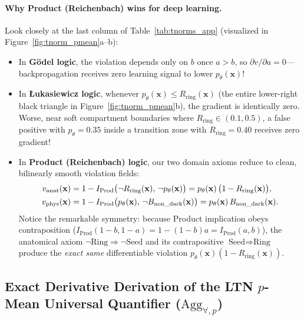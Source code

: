 \documentclass[10pt,a4paper]{article}
\renewcommand{\_}{\origunderscore\allowbreak}
\begin{document}
\paragraph{Why Product (Reichenbach) wins for deep learning.} Look closely at the last column of Table~\ref{tab:tnorms_app} (visualized in Figure~\ref{fig:tnorm_pmean}a--b):
\begin{itemize}
    \item In \textbf{G\"odel logic}, the violation depends only on $b$ once $a > b$, so $\partial v/\partial a = 0$---backpropagation receives zero learning signal to lower $p_\theta(\mathbf{x})$!
    \item In \textbf{{\L}ukasiewicz logic}, whenever $p_\theta(\mathbf{x}) \le R_{\text{ring}}(\mathbf{x})$ (the entire lower-right black triangle in Figure~\ref{fig:tnorm_pmean}b), the gradient is identically zero. Worse, near soft compartment boundaries where $R_{\text{ring}} \in (0.1, 0.5)$, a false positive with $p_\theta = 0.35$ inside a transition zone with $R_{\text{ring}} = 0.40$ receives zero gradient!
    \item In \textbf{Product (Reichenbach) logic}, our two domain axioms reduce to clean, bilinearly smooth violation fields:
    \begin{align}
        v_{\text{anat}}(\mathbf{x}) &= 1 - I_{\text{Prod}}\bigl(\neg R_{\text{ring}}(\mathbf{x}),\, \neg p_\theta(\mathbf{x})\bigr) = p_\theta(\mathbf{x})\,\bigl(1 - R_{\text{ring}}(\mathbf{x})\bigr), \label{eq:v_anat_app} \\
        v_{\text{phys}}(\mathbf{x}) &= 1 - I_{\text{Prod}}\bigl(p_\theta(\mathbf{x}),\, \neg B_{\text{non\_dark}}(\mathbf{x})\bigr) = p_\theta(\mathbf{x})\,B_{\text{non\_dark}}(\mathbf{x}). \label{eq:v_phys_app}
    \end{align}
    Notice the remarkable symmetry: because Product implication obeys contraposition ($I_{\text{Prod}}(1-b, 1-a) = 1 - (1-b)a = I_{\text{Prod}}(a, b)$), the anatomical axiom $\neg\text{Ring} \Rightarrow \neg\text{Seed}$ and its contrapositive $\text{Seed} \Rightarrow \text{Ring}$ produce the \emph{exact same} differentiable violation $p_\theta(\mathbf{x})(1 - R_{\text{ring}}(\mathbf{x}))$.
\end{itemize}

\subsection{Exact Derivative Derivation of the LTN $p$-Mean Universal Quantifier ($\text{Agg}_{\forall,p}$)}
\label{app:pmean_deriv}
\end{document}
